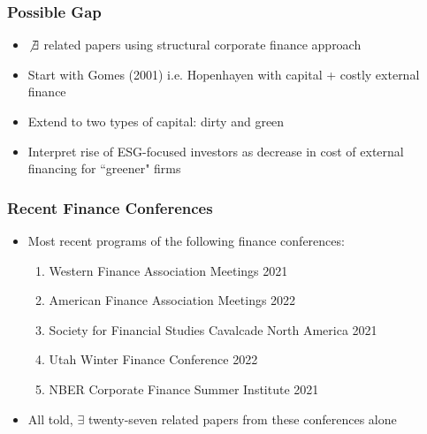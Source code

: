 \documentclass[usenames,dvipsnames, handout]{beamer}
\begin{document}
\begin{frame}
\frametitle{Possible Gap}
\small
\begin{itemize}[<+->] 
\item $\not\exists$ related papers using structural corporate finance approach
\bigskip
\item Start with Gomes (2001) i.e. Hopenhayen with capital + costly external finance
\bigskip
\item Extend to two types of capital: dirty and green
\bigskip
\item Interpret rise of ESG-focused investors as decrease in cost of external financing for ``greener" firms
\end{itemize}
\end{frame}



\begin{frame}[label = methodology]
\frametitle{Recent Finance Conferences}
\begin{itemize}[<+->]
\item Most recent programs of the following finance conferences:
\bigskip
\begin{enumerate}
\item Western Finance Association Meetings 2021
\item American Finance Association Meetings 2022
\item Society for Financial Studies Cavalcade North America 2021
\item Utah Winter Finance Conference 2022
\item NBER Corporate Finance Summer Institute 2021
\end{enumerate}
\bigskip
\item All told, $\exists$ twenty-seven related papers from these conferences alone
\end{itemize}
\hyperlink{cfcc}{}
\end{frame}
\end{document}
